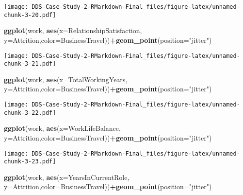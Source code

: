 \documentclass[]{article}
\newenvironment{Shaded}{\begin{snugshade}}{\end{snugshade}}
\newcommand{\DataTypeTok}[1]{\textcolor[rgb]{0.13,0.29,0.53}{#1}}
\newcommand{\KeywordTok}[1]{\textcolor[rgb]{0.13,0.29,0.53}{\textbf{#1}}}
\newcommand{\NormalTok}[1]{#1}
\newcommand{\OperatorTok}[1]{\textcolor[rgb]{0.81,0.36,0.00}{\textbf{#1}}}
\newcommand{\StringTok}[1]{\textcolor[rgb]{0.31,0.60,0.02}{#1}}
\begin{document}
\texttt{[image: DDS-Case-Study-2-RMarkdown-Final\_files/figure-latex/unnamed-chunk-3-20.pdf]}

\begin{Shaded}
\begin{Highlighting}[]
\KeywordTok{ggplot}\NormalTok{(work, }\KeywordTok{aes}\NormalTok{(}\DataTypeTok{x=}\NormalTok{RelationshipSatisfaction, }\DataTypeTok{y=}\NormalTok{Attrition,}\DataTypeTok{color=}\NormalTok{BusinessTravel))}\OperatorTok{+}\KeywordTok{geom_point}\NormalTok{(}\DataTypeTok{position=}\StringTok{"jitter"}\NormalTok{)}
\end{Highlighting}
\end{Shaded}

\texttt{[image: DDS-Case-Study-2-RMarkdown-Final\_files/figure-latex/unnamed-chunk-3-21.pdf]}

\begin{Shaded}
\begin{Highlighting}[]
\KeywordTok{ggplot}\NormalTok{(work, }\KeywordTok{aes}\NormalTok{(}\DataTypeTok{x=}\NormalTok{TotalWorkingYears, }\DataTypeTok{y=}\NormalTok{Attrition,}\DataTypeTok{color=}\NormalTok{BusinessTravel))}\OperatorTok{+}\KeywordTok{geom_point}\NormalTok{(}\DataTypeTok{position=}\StringTok{"jitter"}\NormalTok{)}
\end{Highlighting}
\end{Shaded}

\texttt{[image: DDS-Case-Study-2-RMarkdown-Final\_files/figure-latex/unnamed-chunk-3-22.pdf]}

\begin{Shaded}
\begin{Highlighting}[]
\KeywordTok{ggplot}\NormalTok{(work, }\KeywordTok{aes}\NormalTok{(}\DataTypeTok{x=}\NormalTok{WorkLifeBalance, }\DataTypeTok{y=}\NormalTok{Attrition,}\DataTypeTok{color=}\NormalTok{BusinessTravel))}\OperatorTok{+}\KeywordTok{geom_point}\NormalTok{(}\DataTypeTok{position=}\StringTok{"jitter"}\NormalTok{)}
\end{Highlighting}
\end{Shaded}

\texttt{[image: DDS-Case-Study-2-RMarkdown-Final\_files/figure-latex/unnamed-chunk-3-23.pdf]}

\begin{Shaded}
\begin{Highlighting}[]
\KeywordTok{ggplot}\NormalTok{(work, }\KeywordTok{aes}\NormalTok{(}\DataTypeTok{x=}\NormalTok{YearsInCurrentRole, }\DataTypeTok{y=}\NormalTok{Attrition,}\DataTypeTok{color=}\NormalTok{BusinessTravel))}\OperatorTok{+}\KeywordTok{geom_point}\NormalTok{(}\DataTypeTok{position=}\StringTok{"jitter"}\NormalTok{)}
\end{Highlighting}
\end{Shaded}
\end{document}
